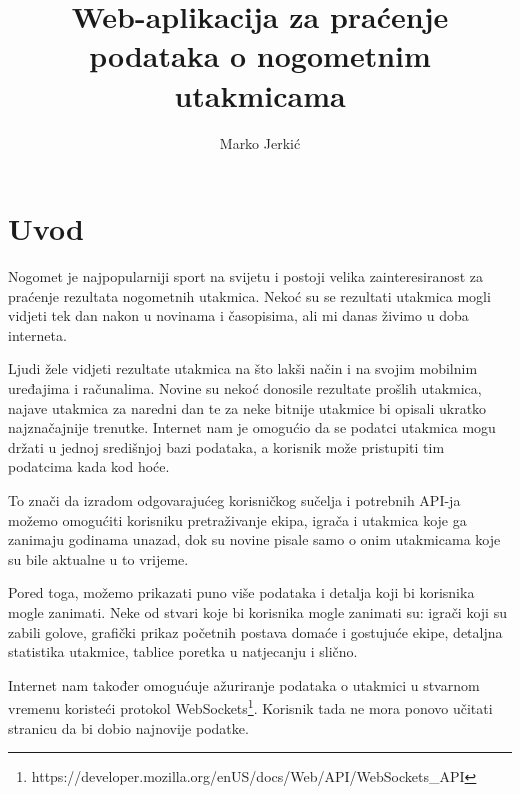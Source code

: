 \documentclass[times, utf8, zavrsni]{fer}
\begin{document}

\title{Web-aplikacija za praćenje podataka o nogometnim utakmicama}

\author{Marko Jerkić}

\maketitle


\zahvala{}

\tableofcontents

\chapter{Uvod}

Nogomet je najpopularniji sport na svijetu i postoji velika zainteresiranost za praćenje rezultata nogometnih utakmica.
Nekoć su se rezultati utakmica mogli vidjeti tek dan nakon u novinama i časopisima, ali mi danas živimo u doba interneta.

Ljudi žele vidjeti rezultate utakmica na što lakši način i na svojim mobilnim uređajima i računalima.
Novine su nekoć donosile rezultate prošlih utakmica, najave utakmica za naredni dan te za neke bitnije utakmice bi opisali ukratko najznačajnije trenutke.
Internet nam je omogućio da se podatci utakmica mogu držati u jednoj središnjoj bazi podataka, a korisnik može pristupiti tim podatcima kada kod hoće.

To znači da izradom odgovarajućeg korisničkog sučelja i potrebnih API-ja možemo omogućiti korisniku pretraživanje ekipa, igrača i utakmica koje ga zanimaju godinama unazad, dok su novine pisale samo o onim utakmicama koje su bile aktualne u to vrijeme.

Pored toga, možemo prikazati puno više podataka i detalja koji bi korisnika mogle zanimati.
Neke od stvari koje bi korisnika mogle zanimati su: igrači koji su zabili golove, grafički prikaz početnih postava domaće i gostujuće ekipe, detaljna statistika utakmice, tablice poretka u natjecanju i slično.

Internet nam također omogućuje ažuriranje podataka o utakmici u stvarnom vremenu koristeći protokol WebSockets\footnote{https://developer.mozilla.org/en\-US/docs/Web/API/WebSockets\_API}.
Korisnik tada ne mora ponovo učitati stranicu da bi dobio najnovije podatke.
\end{document}

